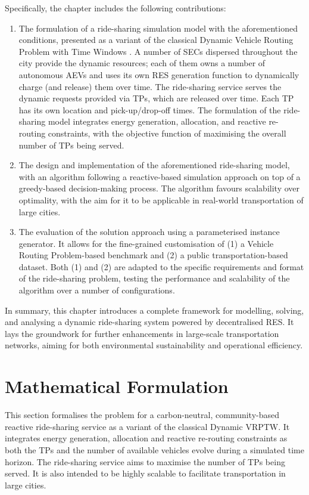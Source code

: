 Specifically, the chapter includes the following contributions: 
\begin{enumerate}
    \item The formulation of a ride-sharing simulation model with the aforementioned conditions, presented as a variant of the classical Dynamic Vehicle Routing Problem with Time Windows \cite{vrp_survey}.  
    A number of SECs dispersed throughout the city provide the dynamic resources; each of them owns a number of autonomous AEVs and uses its own RES generation function to dynamically charge (and release) them over time. The ride-sharing service serves the dynamic requests provided via TPs, which are released over time. Each TP has its own location and pick-up/drop-off times. The formulation of the ride-sharing model integrates energy generation, allocation, and reactive re-routing constraints, with the objective function of maximising the overall number of TPs being served.  
    \item The design and implementation of the aforementioned ride-sharing model, with an algorithm following a reactive-based simulation approach on top of a greedy-based decision-making process. The algorithm favours scalability over optimality, with the aim for it to be applicable in real-world transportation of large cities. 
    \item The evaluation of the solution approach using a parameterised instance generator. It allows for the fine-grained customisation of (1) a Vehicle Routing Problem-based benchmark and (2) a public transportation-based dataset. Both (1) and (2) are adapted to  the specific requirements and format of the ride-sharing problem, testing the performance and scalability of the algorithm over a number of configurations. 
\end{enumerate}
In summary, this chapter introduces a complete framework for modelling, solving, and analysing a dynamic ride-sharing system powered by decentralised RES. It lays the groundwork for further enhancements in large-scale transportation networks, aiming for both environmental sustainability and operational efficiency.

\section{Mathematical Formulation}
\label{sec:proposed_system}

This section formalises the problem for a carbon-neutral, community-based reactive ride-sharing service as a variant of the classical Dynamic VRPTW. It integrates energy generation, allocation and reactive re-routing constraints as both the TPs and the number of available vehicles evolve during a simulated time horizon.  The ride-sharing service aims to maximise the number of TPs being served.  It is also intended to be highly scalable to facilitate transportation in large cities. 

